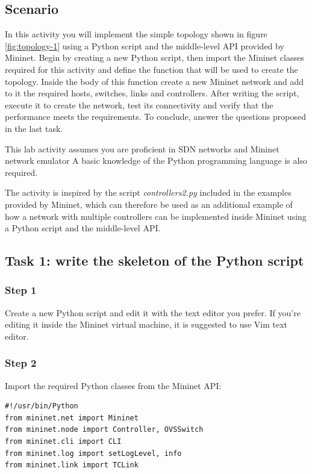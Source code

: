 \subsection*{Scenario}
In this activity you will implement the simple topology shown in figure \ref{fig:topology-1} using
a Python script and the middle-level API provided by Mininet.
Begin by creating a new Python script, then import the Mininet classes required for
this activity and define the function that will be used to create the topology.
Inside the body of this function create a new Mininet network and add to it the
required hosts, switches, links and controllers. After writing the script, execute
it to create the network, test its connectivity and verify that the performance
meets the requirements. To conclude, answer the questions proposed in the last task.

This lab activity assumes you are proficient in SDN networks and Mininet network
emulator %
A basic knowledge of the Python programming language is also required.

The activity is inspired by the script \textit{controllers2.py} \cite{ref-3} included in the
examples provided by Mininet, which can therefore be used as
an additional example of how a network with multiple controllers can be implemented
inside Mininet using a Python script and the middle-level API.




\subsection*{Task 1: write the skeleton of the Python script}
\subsubsection*{Step 1}
Create a new Python script and edit it with the text editor you prefer. If you're editing
it inside the Mininet virtual machine, it is suggested to use Vim text editor.

\subsubsection*{Step 2}
Import the required Python classes from the Mininet API:
\begin{lstlisting}
#!/usr/bin/Python
from mininet.net import Mininet
from mininet.node import Controller, OVSSwitch
from mininet.cli import CLI
from mininet.log import setLogLevel, info
from mininet.link import TCLink
\end{lstlisting}

